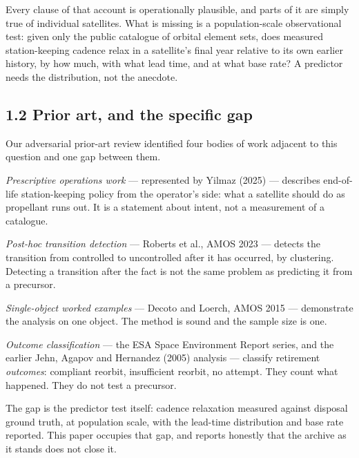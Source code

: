 \documentclass[11pt]{article}
\begin{document}
Every clause of that account is operationally plausible, and parts of it are simply true of individual satellites. What is missing is a population-scale observational test: given only the public catalogue of orbital element sets, does measured station-keeping cadence relax in a satellite's final year relative to its own earlier history, by how much, with what lead time, and at what base rate? A predictor needs the distribution, not the anecdote.

\subsection*{1.2 Prior art, and the specific gap}

Our adversarial prior-art review identified four bodies of work adjacent to this question and one gap between them.

\emph{Prescriptive operations work} --- represented by Yilmaz (2025) --- describes end-of-life station-keeping policy from the operator's side: what a satellite should do as propellant runs out. It is a statement about intent, not a measurement of a catalogue.

\emph{Post-hoc transition detection} --- Roberts et al., AMOS 2023 --- detects the transition from controlled to uncontrolled after it has occurred, by clustering. Detecting a transition after the fact is not the same problem as predicting it from a precursor.

\emph{Single-object worked examples} --- Decoto and Loerch, AMOS 2015 --- demonstrate the analysis on one object. The method is sound and the sample size is one.

\emph{Outcome classification} --- the ESA Space Environment Report series, and the earlier Jehn, Agapov and Hernandez (2005) analysis --- classify retirement \emph{outcomes}: compliant reorbit, insufficient reorbit, no attempt. They count what happened. They do not test a precursor.

The gap is the predictor test itself: cadence relaxation measured against disposal ground truth, at population scale, with the lead-time distribution and base rate reported. This paper occupies that gap, and reports honestly that the archive as it stands does not close it.
\end{document}
